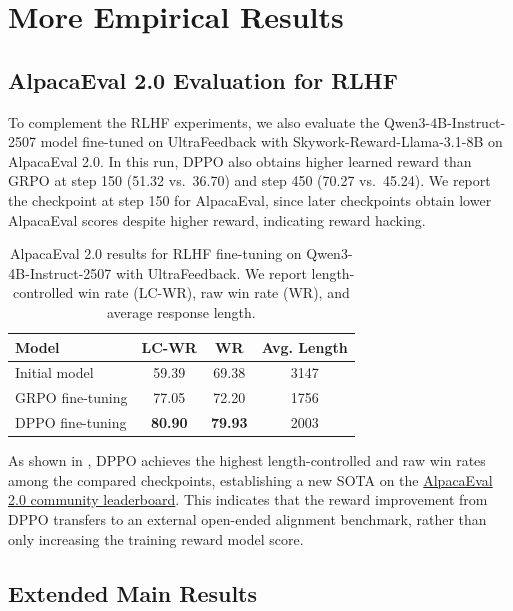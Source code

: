 \section{More Empirical Results}


\subsection{AlpacaEval 2.0 Evaluation for RLHF}
\label{appendix:rlhf_alpacaeval}

To complement the RLHF experiments, we also evaluate the Qwen3-4B-Instruct-2507 model fine-tuned on UltraFeedback with Skywork-Reward-Llama-3.1-8B on AlpacaEval 2.0. In this run, DPPO also obtains higher learned reward than GRPO at step 150 (51.32 vs.\ 36.70) and step 450 (70.27 vs.\ 45.24). We report the checkpoint at step 150 for AlpacaEval, since later checkpoints obtain lower AlpacaEval scores despite higher reward, indicating reward hacking.

\begin{table}[h]
    \renewcommand{\arraystretch}{1.05}
    \caption{AlpacaEval 2.0 results for RLHF fine-tuning on Qwen3-4B-Instruct-2507 with UltraFeedback. We report length-controlled win rate (LC-WR), raw win rate (WR), and average response length.}
    \label{tab:rlhf_alpacaeval}
    \centering
    \small
    \begin{tabular}{lccc}
    \toprule
    \textbf{Model} & \textbf{LC-WR} & \textbf{WR} & \textbf{Avg. Length} \\
    \midrule
    Initial model & 59.39 & 69.38 & 3147 \\
    GRPO fine-tuning & 77.05 & 72.20 & 1756 \\
    DPPO fine-tuning & \textbf{80.90} & \textbf{79.93} & 2003 \\
    \bottomrule
    \end{tabular}
\end{table}

As shown in , DPPO achieves the highest length-controlled and raw win rates among the compared checkpoints, establishing a new SOTA on the \href{https://tatsu-lab.github.io/alpaca_eval/}{AlpacaEval 2.0 community leaderboard}. This indicates that the reward improvement from DPPO transfers to an external open-ended alignment benchmark, rather than only increasing the training reward model score.


\subsection{Extended Main Results}
\label{appendix:extended_main_results}

